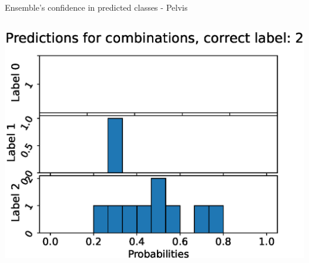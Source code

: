 \begin{frame}[fragile]{Ensemble's confidence in predicted classes - Pelvis}
\begin{columns}[T,onlytextwidth]
      \includegraphics[width=\textwidth]{files/figs/res/pelvis/pc2.eps}
  \end{columns}
\end{frame}

